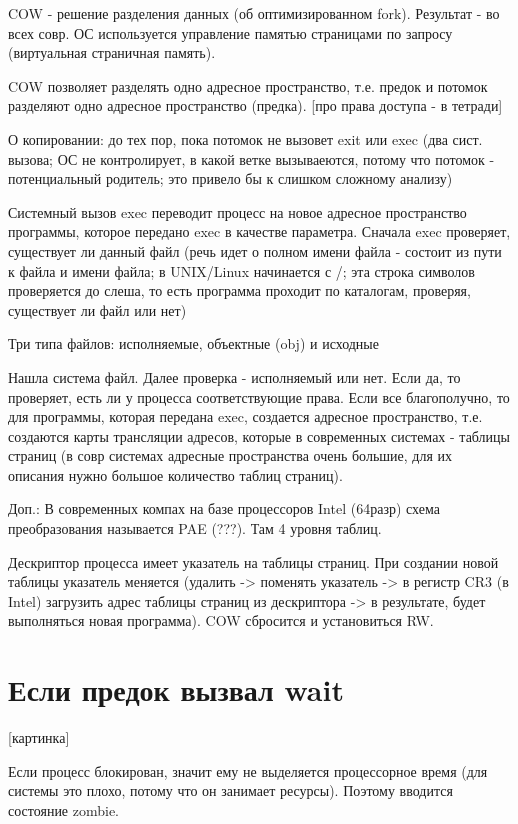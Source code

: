 \documentclass[14pt, a4paper]{article}
\begin{document}
	COW - решение разделения данных (об оптимизированном fork). Результат - во всех совр. ОС используется управление памятью страницами по запросу (виртуальная страничная память).
	
	COW позволяет разделять одно адресное пространство, т.е. предок и потомок разделяют одно адресное пространство (предка). [про права доступа - в тетради]
	
	О копировании: до тех пор, пока потомок не вызовет exit или exec (два сист. вызова; ОС не контролирует, в какой ветке вызываеются, потому что потомок - потенциальный родитель; это привело бы к слишком сложному анализу)
	
	Системный вызов exec переводит процесс на новое адресное пространство программы, которое передано exec в качестве параметра. Сначала exec проверяет, существует ли данный файл (речь идет о полном имени файла - состоит из пути к файла и имени файла; в UNIX/Linux начинается с /; эта строка символов проверяется до слеша, то есть программа проходит по каталогам, проверяя, существует ли файл или нет)
	
	Три типа файлов: исполняемые, объектные (obj) и исходные
	
	Нашла система файл. Далее проверка - исполняемый или нет. Если да, то проверяет, есть ли у процесса соответствующие права. Если все благополучно, то для программы, которая передана exec, создается адресное пространство, т.е. создаются карты трансляции адресов, которые в современных системах - таблицы страниц (в совр системах адресные пространства очень большие, для их описания нужно большое количество таблиц страниц).
	
	Доп.: В современных компах на базе процессоров Intel (64разр) схема преобразования называется PAE (???). Там 4 уровня таблиц.
	
	Дескриптор процесса имеет указатель на таблицы страниц. При создании новой таблицы указатель меняется (удалить -> поменять указатель -> в регистр CR3 (в Intel) загрузить адрес таблицы страниц из дескриптора -> в результате, будет выполняться новая программа). COW сбросится и установиться RW.
	
	\section{Если предок вызвал wait}
	
	[картинка]
	
	Если процесс блокирован, значит ему не выделяется процессорное время (для системы это плохо, потому что он занимает ресурсы).
	Поэтому вводится состояние zombie.
	
\end{document}
